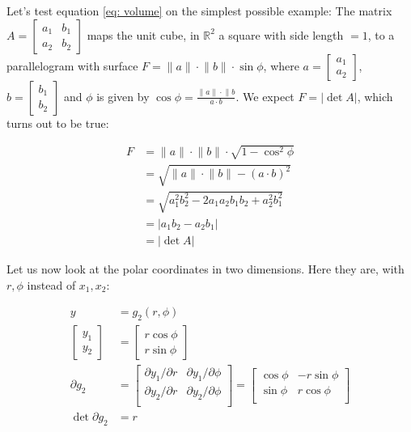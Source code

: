 \documentclass{article}
\begin{document}
Let's test equation \ref{eq: volume} on the simplest possible example: The matrix  
$A = \begin{bmatrix}
a_1 & b_1 \\
a_2 & b_2
\end{bmatrix}$
maps the unit cube, in $\mathbb{R}^2$ a square with side length $ = 1$, to a parallelogram with surface
$F = \lVert a \rVert \cdot \lVert b \rVert \cdot \sin\phi$,
where $
a = \begin{bmatrix}
a_1 \\
a_2
\end{bmatrix}$,
$b = \begin{bmatrix}
b_1 \\
b_2
\end{bmatrix}$
and $\phi$ is given by $\cos\phi = \frac{\lVert a \rVert \cdot \lVert b}{a \cdot b}$. We expect $F = \lvert \det A \rvert$, which turns out to be true: 


\begin{equation*}
\begin{split}
F &= \lVert a \rVert \cdot \lVert b \rVert \cdot \sqrt{1 - \cos^2 \phi} \\
  &= \sqrt{\lVert a \rVert \cdot \lVert b  \rVert - (a \cdot b)^2} \\
  &= \sqrt{a_1^2 b_2^2 - 2 a_1a_2 b_1 b_2 + a_2^2 b_1^2} \\
  &= \lvert a_1 b_2 - a_2 b_1 \rvert \\
  &= \lvert \det A \rvert
\end{split}
\end{equation*}


Let us now look at the polar coordinates in two dimensions. Here they are, with $r, \phi$ instead of $x_1, x_2$:

\begin{align*}
y &= g_2(r, \phi) \\
\begin{bmatrix}
y_1 \\
y_2
\end{bmatrix} &= \begin{bmatrix}
r \cos \phi \\
r \sin \phi
\end{bmatrix} \\
\partial g_2 &= \begin{bmatrix}
\partial y_1 / \partial r &\partial y_1 / \partial \phi \\
\partial y_2 / \partial r &\partial y_2 / \partial \phi \\
\end{bmatrix} = \begin{bmatrix}
\cos \phi & -r  \sin \phi \\
\sin \phi & r  \cos \phi \\
\end{bmatrix} \\
\det \partial g_2 &= r
\end{align*}
\end{document}

